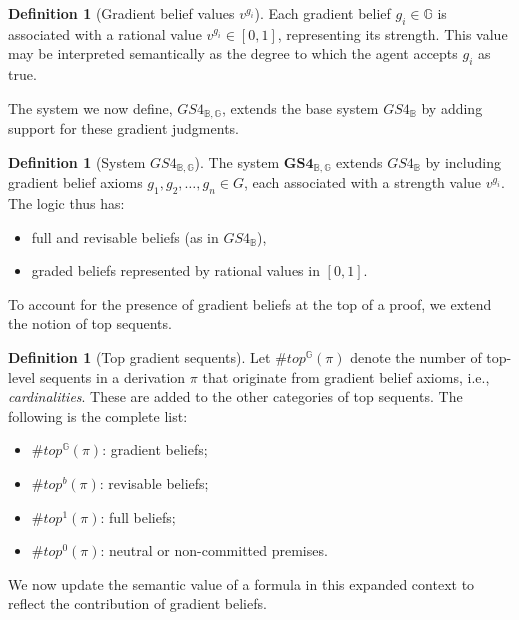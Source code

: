 \documentclass[12pt,a4paper,reqno]{amsart}
\theoremstyle{definition}
\newtheorem{definition}[theorem]{Definition}
\newcommand{\numberset}{\mathbb}
\newcommand{\B}{\numberset{B}}
\newcommand{\G}{\numberset{G}}
\begin{document}
\begin{definition}[Gradient belief values $v^{g_i}$]
Each gradient belief $g_i \in \G$ is associated with a rational value $v^{g_i} \in [0,1]$, representing its strength. This value may be interpreted semantically as the degree to which the agent accepts $g_i$ as true.
\end{definition}



The system we now define, $GS4_{\B,\G}$, extends the base system $GS4_\B$ by adding support for these gradient judgments.

\begin{definition}[System $GS4_{\B,\G}$]
The system $\mathbf{GS4_{\B,\G}}$ extends $GS4_\B$ by including gradient belief axioms $g_1, g_2, \dots, g_n \in G$, each associated with a strength value $v^{g_i}$. The logic thus has:
\begin{itemize}
 \item full and revisable beliefs (as in $GS4_\B$),
 \item graded beliefs represented by rational values in $[0,1]$.
\end{itemize}
\end{definition}

To account for the presence of gradient beliefs at the top of a proof, we extend the notion of top sequents.

\begin{definition}[Top gradient sequents]
Let $\#top^{\G}(\pi)$ denote the number of top-level sequents in a derivation $\pi$ that originate from gradient belief axioms, i.e., \textit{cardinalities}. These are added to the other categories of top sequents. The following is the complete list:
\begin{itemize}
 \item $\#top^\G(\pi)$: gradient beliefs;
 \item $\#top^b(\pi)$: revisable beliefs;
 \item $\#top^1(\pi)$: full beliefs;
 \item $\#top^0(\pi)$: neutral or non-committed premises.
\end{itemize}
\end{definition}

We now update the semantic value of a formula in this expanded context to reflect the contribution of gradient beliefs.
\end{document}
